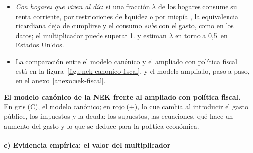 \documentclass[11pt]{article}
\begin{document}
\begin{itemize}
\begin{itemize}
  \end{itemize}
\item \emph{Con hogares que viven al día}: si una fracción $\lambda$ de los hogares consume su renta corriente, por restricciones de liquidez o por miopía\nocite{CampbellMankiw1989Consumption} , la equivalencia ricardiana deja de cumplirse y el consumo \emph{sube} con el gasto, como en los datos; el multiplicador puede superar 1\nocite{GaliLopezSalidoValles2007}.  y  estiman $\lambda$ en torno a 0,5~en Estados Unidos.
\item La comparación entre el modelo canónico y el ampliado con política fiscal está en la figura~\ref{figu:nek-canonico-fiscal}, y el modelo ampliado, paso a paso, en el anexo~\ref{anexo:nek-fiscal}.
\end{itemize}

\begin{anotaciones}
\textbf{El modelo canónico de la NEK frente al ampliado con política fiscal.} En gris (\textsf{C}), el modelo canónico; en rojo (+), lo que cambia al introducir el gasto público, los impuestos y la deuda: los supuestos, las ecuaciones, qué hace un aumento del gasto y lo que se deduce para la política económica.
\begin{infografiacaja}
\caption{El modelo neokeynesiano canónico y el ampliado con política fiscal}\label{figu:nek-canonico-fiscal}
\end{infografiacaja}
\end{anotaciones}

\paragraph{c) Evidencia empírica: el valor del multiplicador}
\end{document}

